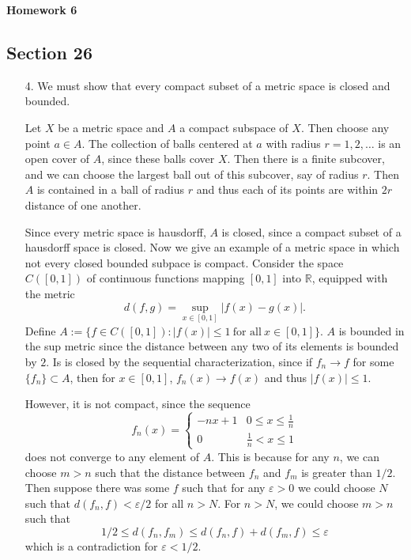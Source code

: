 \documentclass[11pt, reqno]{article}
\theoremstyle{plain}
\theoremstyle{definition}
\theoremstyle{remark}
\renewcommand{\epsilon}{\varepsilon}
\newcommand{\RR}{\mathbb{R}}
\begin{document}
\topmargin=-40pt
\renewcommand{\headrulewidth}{1pt}
\renewcommand{\headsep}{20pt}
\thispagestyle{fancy}

{\Huge \bfseries \noindent Homework 6}

\subsection*{Section 26}

\begin{enumerate}
    \item[4.] We must show that every compact subset of a metric space is closed and bounded. 
    
    Let $X$ be a metric space and $A$ a compact subspace of $X$. Then choose any point $a \in A$. The
    collection of balls centered at $a$ with radius $r = 1, 2, \dots$ is an open cover of $A$, since 
    these balls cover $X$. Then there is a finite subcover, and we can choose the largest ball out of this 
    subcover, say of radius $r$. Then $A$ is contained in a ball of radius $r$ and thus each of its points 
    are within $2r$ distance of one another. 

    Since every metric space is hausdorff, $A$ is closed, since a compact subset of a hausdorff space is 
    closed.
    \bigbreak
    Now we give an example of a metric space in which not every closed bounded subpace is compact. 
    Consider the space $C([0,1])$ of continuous functions mapping $[0,1]$ into $\RR$, equipped with 
    the metric 
    \[
        d(f,g) = \sup_{x \in [0,1]} |f(x) - g(x)|.
    \]
    Define $A := \{f \in C([0,1]): |f(x)| \leq 1\ \text{for all}\ x \in [0,1]\}$. $A$ is bounded 
    in the sup metric since the distance between any two of its elements is bounded by $2$. 
    Is is closed by the sequential characterization, since if $f_n \rightarrow f$ for some $\{f_n\} \subset A$,
    then for $x \in [0,1]$, $f_n(x) \rightarrow f(x)$ and thus $|f(x)| \leq 1$. 

    However, it is not compact, since the sequence 
    \[
        f_n(x) = \begin{cases} -nx + 1 & 0 \leq x \leq \frac{1}{n}\\ 0 & \frac{1}{n} < x \leq 1\end{cases}
    \]
    does not converge to any element of $A$. This is because for any $n$, we can choose $m > n$ 
    such that the distance between $f_n$ and $f_m$ is greater than $1/2$. Then suppose there was some $f$ 
    such that for any $\epsilon > 0$ we could choose $N$ such that $d(f_n, f) < \epsilon/2$ for all $n > N$.
    For $n > N$, we could choose $m > n$ such that 
    \[
        1/2 \leq d(f_n, f_m) \leq d(f_n, f) + d(f_m, f) \leq \epsilon
    \]
    which is a contradiction for $\epsilon < 1/2$. 


\end{enumerate}
\end{document}
